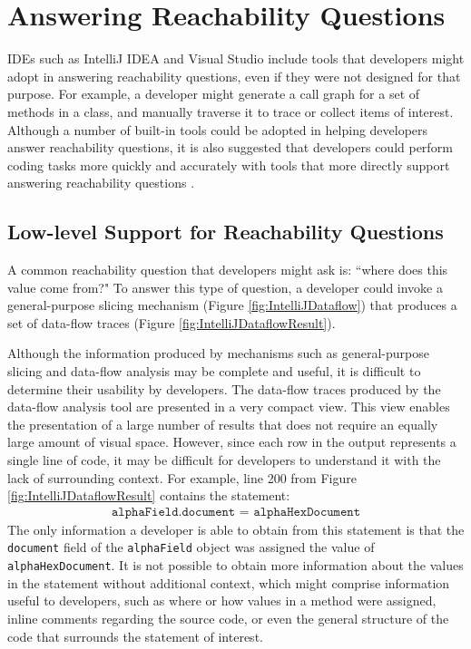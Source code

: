 \section{Answering Reachability Questions}
\label{sec:AnsweringReachabilityQuestions}

\acp{IDE} such as IntelliJ IDEA and Visual Studio include tools that developers 
might adopt in answering reachability questions, even if they were not designed
for that purpose.
For example, a developer might generate a call graph for a set of methods in a
class, and manually traverse it to trace or collect items of interest.
Although a number of built-in tools could be adopted in helping developers
answer reachability questions, it is also suggested that developers could 
perform coding tasks more quickly and accurately with tools that more directly 
support answering reachability questions \cite{latoza-2010-reach}.

\subsection{Low-level Support for Reachability Questions}
\label{subsec:LowLevelSupportReachabilityQuestions}

A common reachability question that developers might ask is: ``where does this
value come from?"
To answer this type of question, a developer could invoke a general-purpose
slicing mechanism (Figure \ref{fig:IntelliJDataflow}) that produces  a set of 
data-flow traces (Figure \ref{fig:IntelliJDataflowResult}).

\par Although the information produced by mechanisms such as general-purpose
slicing and data-flow analysis may be complete and useful, it is difficult
to determine their usability by developers.
The data-flow traces produced by the data-flow analysis tool are presented in a 
very compact view.
This view enables the presentation of a large number of results that does not 
require an equally large amount of visual space.
However, since each row in the output represents a single line of code, it may 
be difficult for developers to understand it with the lack of surrounding
context.
For example, line 200 from Figure \ref{fig:IntelliJDataflowResult} contains the
statement:
\begin{align*}
  \texttt{alphaField.document = alphaHexDocument}
\end{align*}
The only information a developer is able to obtain from this statement is that
the \texttt{document} field of the \texttt{alphaField} object was assigned
the value of \texttt{alphaHexDocument}.
It is not possible to obtain more information about the values in the statement
without additional context, which might comprise information useful to 
developers, such as where or how values in a method were assigned, inline 
comments regarding the source code, or even the general structure of the code
that surrounds the statement of interest.

